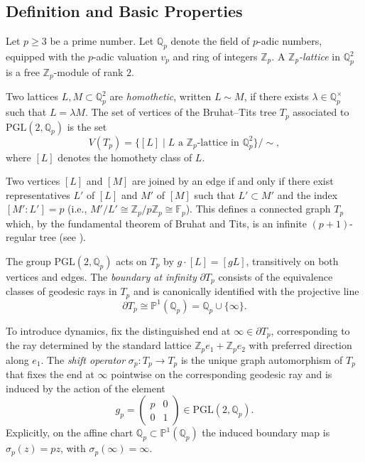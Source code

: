 \subsection{Definition and Basic Properties}

Let \(p \geq 3\) be a prime number. Let \(\mathbb{Q}_p\) denote the field of \(p\)-adic numbers, equipped with the \(p\)-adic valuation \(v_p\) and ring of integers \(\mathbb{Z}_p\). A \emph{\(\mathbb{Z}_p\)-lattice} in \(\mathbb{Q}_p^2\) is a free \(\mathbb{Z}_p\)-module of rank \(2\).

Two lattices \(L, M \subset \mathbb{Q}_p^2\) are \emph{homothetic}, written \(L \sim M\), if there exists \(\lambda \in \mathbb{Q}_p^\times\) such that \(L = \lambda M\). The set of vertices of the Bruhat--Tits tree \(T_p\) associated to \(\mathrm{PGL}(2, \mathbb{Q}_p)\) is the set
\[
V(T_p) = \{ [L] \mid L \text{ a \(\mathbb{Z}_p\)-lattice in \(\mathbb{Q}_p^2\)} \}/\sim,
\]
where \([L]\) denotes the homothety class of \(L\).

Two vertices \([L]\) and \([M]\) are joined by an edge if and only if there exist representatives \(L'\) of \([L]\) and \(M'\) of \([M]\) such that \(L' \subset M'\) and the index \([M' : L'] = p\) (i.e., \(M'/L' \cong \mathbb{Z}_p/p\mathbb{Z}_p \cong \mathbb{F}_p\)). This defines a connected graph \(T_p\) which, by the fundamental theorem of Bruhat and Tits, is an infinite \((p+1)\)-regular tree (see \cite{BruhatTits72,Serre80}).

The group \(\mathrm{PGL}(2, \mathbb{Q}_p)\) acts on \(T_p\) by \(g \cdot [L] = [gL]\), transitively on both vertices and edges. The \emph{boundary at infinity} \(\partial T_p\) consists of the equivalence classes of geodesic rays in \(T_p\) and is canonically identified with the projective line
\[
\partial T_p \cong \mathbb{P}^1(\mathbb{Q}_p) = \mathbb{Q}_p \cup \{\infty\}.
\]

To introduce dynamics, fix the distinguished end at \(\infty \in \partial T_p\), corresponding to the ray determined by the standard lattice \(\mathbb{Z}_p e_1 + \mathbb{Z}_p e_2\) with preferred direction along \(e_1\). The \emph{shift operator} \(\sigma_p : T_p \to T_p\) is the unique graph automorphism of \(T_p\) that fixes the end at \(\infty\) pointwise on the corresponding geodesic ray and is induced by the action of the element
\[
g_p = \begin{pmatrix} p & 0 \\ 0 & 1 \end{pmatrix} \in \mathrm{PGL}(2, \mathbb{Q}_p).
\]
Explicitly, on the affine chart \(\mathbb{Q}_p \subset \mathbb{P}^1(\mathbb{Q}_p)\) the induced boundary map is \(\sigma_p(z) = p z\), with \(\sigma_p(\infty) = \infty\).

